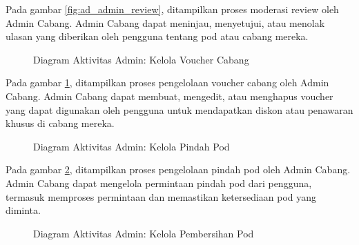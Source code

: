Pada gambar \ref{fig:ad_admin_review}, ditampilkan proses moderasi review oleh Admin Cabang. Admin Cabang dapat meninjau, menyetujui, atau menolak ulasan yang diberikan oleh pengguna tentang pod atau cabang mereka.

\begin{figure}[H] %
    \centering
    \caption{Diagram Aktivitas Admin: Kelola Voucher Cabang}
    \label{fig:ad_admin_voucher} %
\end{figure}

Pada gambar \ref{fig:ad_admin_voucher}, ditampilkan proses pengelolaan voucher cabang oleh Admin Cabang. Admin Cabang dapat membuat, mengedit, atau menghapus voucher yang dapat digunakan oleh pengguna untuk mendapatkan diskon atau penawaran khusus di cabang mereka.

\begin{figure}[H] %
    \centering
    \caption{Diagram Aktivitas Admin: Kelola Pindah Pod}
    \label{fig:ad_admin_booking} %
\end{figure}

Pada gambar \ref{fig:ad_admin_booking}, ditampilkan proses pengelolaan pindah pod oleh Admin Cabang. Admin Cabang dapat mengelola permintaan pindah pod dari pengguna, termasuk memproses permintaan dan memastikan ketersediaan pod yang diminta.

\begin{figure}[H] %
    \centering
    \caption{Diagram Aktivitas Admin: Kelola Pembersihan Pod}
    \label{fig:ad_admin_cleaning} %
\end{figure}

